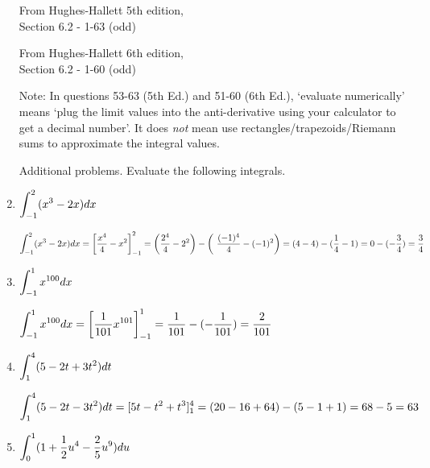 \begin{enumerate}[1.]
\begin{multicols}{2}

From Hughes-Hallett 5th edition,  \\
Section 6.2 - 1-63 (odd)
\columnbreak

From Hughes-Hallett 6th edition,  \\
Section 6.2 - 1-60 (odd)

\end{multicols}
Note: In questions 53-63 (5th Ed.) and 51-60 (6th Ed.), `evaluate
numerically'  means `plug the limit values into the anti-derivative
using your calculator to get a decimal number'. It does {\em not} mean
use rectangles/trapezoids/Riemann sums to approximate the integral
values.  

\hrulefill

Additional problems. Evaluate the following integrals.

\item \begin{Question}
  $\displaystyle \int_{-1}^2 (x^3 - 2x) dx$
\end{Question}

\begin{Solution}
  $\displaystyle \int_{-1}^2 (x^3 - 2x) dx = \left[ \frac{x^4}{4} - x^2 
    \right]_{-1}^2 = \left( \frac{2^4}{4} - 2^2 \right) - \left( \
      \frac{(-1)^4}{4} - (-1)^2 \right) = (4 - 4) - (\frac{1}{4} - 1) = 0
    - (- \frac{3}{4}) = \frac{3}{4}$
\end{Solution}

\item \begin{Question}
  $\displaystyle \int_{-1}^1 x^{100} dx$
\end{Question}

\begin{Solution}
  $\displaystyle \int_{-1}^1 x^{100} dx = \left[ \frac{1}{101} x^{101} 
    \right]_{-1}^{1} = \frac{1}{101} - (- \frac{1}{101}) = 
    \frac{2}{101}$
\end{Solution}

\item \begin{Question}
  $\displaystyle \int_{1}^4 (5 - 2t +3t^2) dt$
\end{Question}

\begin{Solution}
  $\displaystyle \int_1^4 (5 - 2t - 3t^2) dt = [5t - t^2 + t^3]_1^4 = 
    (20 - 16 + 64) - (5 - 1 + 1) = 68 - 5 = 63$
\end{Solution}

\item \begin{Question}
  $\displaystyle \int_0^1 (1 + \frac{1}{2} u^4 - \frac{2}{5} u^9) du$
\end{Question}


\end{enumerate}
